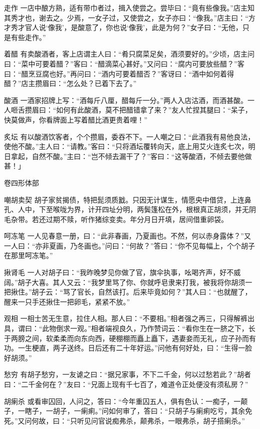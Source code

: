 \documentclass[12pt,UTF8]{ctexbook}
\begin{document}
走作
一店中酿方熟，适有带巾者过，揖入使尝之。尝毕曰：“竟有些像我。”店主知其秀才也，谢去之。少焉，一女子过，又使尝之，女子亦曰：“像我。”店主曰：“方才秀才官人说‘像我’，是酸意了，你也说‘像我’，此是为何？”女子曰：“无他，只是有些走作。”

着醋
有卖酸酒者，客上店谓主人曰：“肴只腐菜足矣，酒须要好的。”少顷，店主问曰：“菜中可要着醋？”客曰：“醋滴菜心甚好。”又问曰：“腐内可要放些醋？”客曰：“醋烹豆腐也好。”再问曰：“酒内可要着醋否？”客讶曰：“酒中如何着得醋？”店主攒眉曰：“怎么处？已着下去了。”

酸酒
一酒家招牌上写：“酒每斤八厘，醋每斤一分。”两人入店沽酒，而酒甚酸。一人咂舌攒眉曰：“如何有此酸酒，莫不把醋错拿了来？”友人忙捏其腿曰：“呆子，快莫做声，你看牌面上写着醋比酒更贵着哩！”

炙坛
有以酸酒饮客者，个个攒眉，委吞不下。一人嘲之曰：“此酒我有易他良法，使他不酸。”主人曰：“请教。”客曰：“只将酒坛覆转向天，底上用艾火连炙七次，明日拿起，自然不酸。”主曰：“岂不倾去漏干了？”客曰：“这等酸酒，不倾去要他做甚！」

卷四形体部

嘲胡卖契
胡子家贫揭债，特把髭须质戤。只因无计谋生，情愿央中借贷，上连鼻孔、人中，下至喉咙为界，计开四址分明，两鬓篷松在外，根根真正胡须，并无阴毛杂带。若还过期不赎，听作猪综变卖。年分月日开填，居间借重卵袋。

呵冻笔
一人见春意一册，曰：“此非春画，乃夏画也。不然，何以赤身露体？”又一人曰：“亦非夏画，乃冬画也。”问曰：“何故？”答曰：“你不见每幅上，个个胡子在那里呵冻笔。”

揪肾毛
一人对胡子曰：“我昨晚梦见你做了官，旗伞执事，吆喝齐声，好不威阔。”胡子大喜。其人又云：“我梦里骂了你、你就呼皂隶来打我，被我将你胡须一把揪住。”胡子云：“骂了官长，自然该打。后来毕竟如何？”其人曰：“也就醒了，醒来一只手还揪住一把卵毛，紧紧不放。”

观相
一相士苦无生意，拉住人相。那人曰：“不要相。”相者强之再三，只得解裤出具，谓曰：“此物倒求一观。”相者端视良久，乃作赞词云：“看你生在一脐之下，长于两膀之间，软柔柔而向东向西，硬棚棚而矗上矗下，遇妻妾而无礼，应子孙而有功。一生梗直，两子送终。日后还有二十年好运。”问他有何好处，曰：“生得一脸好胡须。”

愁穷
有胡子愁穷，一友谑之曰：“据兄家事，不下二千金，何以过愁若此？”胡者曰：“二千金何在？”友曰：“兄面上现有千七百了，难道令正处便没有须私房？”

胡瘌杀
或看审囚回，人问之，答曰：“今年重囚五人，俱有色认：一痴子，一颠子，一瞎子，一胡子，一瘌痢。”问如何审了，答曰：“只胡子与瘌痢吃亏，其余免死。”又问何故，曰：“只听见问官说痴弗杀，颠弗杀，一眼弗杀，胡子搭瘌杀。”
\end{document}
